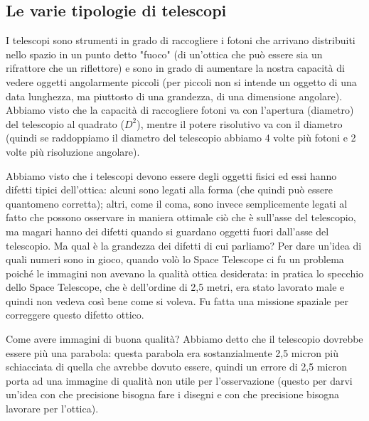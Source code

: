 \documentclass[a4paper,11pt]{article}
\begin{document}
\subsection{Le varie tipologie di telescopi}
I telescopi sono strumenti in grado di raccogliere i fotoni che arrivano distribuiti nello spazio in un punto detto "fuoco" (di un’ottica che può essere sia un rifrattore che un riflettore) e sono in grado di aumentare la nostra capacità di vedere oggetti angolarmente piccoli (per piccoli non si intende un oggetto di una data lunghezza, ma piuttosto di una grandezza, di una dimensione angolare).
Abbiamo visto che la capacità di raccogliere fotoni va con l’apertura (diametro) del telescopio al quadrato ($D^2$), mentre il potere risolutivo va con il diametro (quindi se raddoppiamo il diametro del telescopio abbiamo 4 volte più fotoni e 2 volte più risoluzione angolare).

Abbiamo visto che i telescopi devono essere degli oggetti fisici ed essi hanno difetti tipici dell’ottica: alcuni sono legati alla forma (che quindi può essere quantomeno corretta); altri, come il coma, sono invece semplicemente legati al fatto che possono osservare in maniera ottimale ciò che è sull’asse del telescopio, ma magari hanno dei difetti quando si guardano oggetti fuori dall’asse del telescopio. Ma qual è la grandezza dei difetti di cui parliamo? Per dare un’idea di quali numeri sono in gioco, quando volò lo Space Telescope ci fu un problema poiché le immagini non avevano la qualità ottica desiderata: in pratica lo specchio dello Space Telescope, che è dell’ordine di 2,5 metri, era stato lavorato male e quindi non vedeva così bene come si voleva. Fu fatta una missione spaziale per correggere questo difetto ottico.

Come avere immagini di buona qualità? Abbiamo detto che il telescopio dovrebbe essere più una parabola: questa parabola era sostanzialmente 2,5 micron più schiacciata di quella che avrebbe dovuto essere, quindi un errore di 2,5 micron porta ad una immagine di qualità non utile per l’osservazione (questo per darvi un'idea con che precisione bisogna fare i disegni e con che precisione bisogna lavorare per l'ottica).
\end{document}
